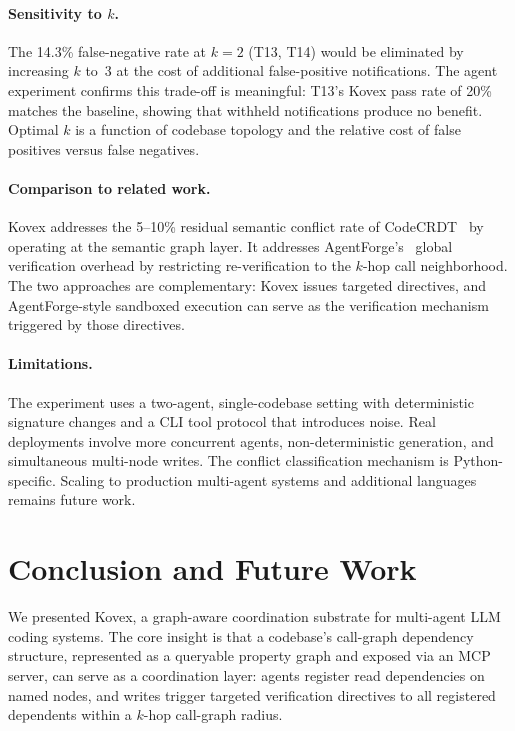 \documentclass[12pt]{article}
\begin{document}
\paragraph{Sensitivity to $k$.}
The 14.3\% false-negative rate at $k=2$ (T13, T14) would be eliminated by
increasing $k$ to~3 at the cost of additional false-positive notifications.
The agent experiment confirms this trade-off is meaningful: T13's Kovex pass
rate of 20\% matches the baseline, showing that withheld notifications produce
no benefit. Optimal $k$ is a function of codebase topology and the relative
cost of false positives versus false negatives.

\paragraph{Comparison to related work.}
Kovex addresses the 5--10\% residual semantic conflict rate of
CodeCRDT~\cite{pugachev2025codecrdt} by operating at the semantic graph layer.
It addresses AgentForge's~\cite{kumar2026agentforge} global verification
overhead by restricting re-verification to the $k$-hop call neighborhood.
The two approaches are complementary: Kovex issues targeted directives, and
AgentForge-style sandboxed execution can serve as the verification mechanism
triggered by those directives.

\paragraph{Limitations.}
The experiment uses a two-agent, single-codebase setting with deterministic
signature changes and a CLI tool protocol that introduces noise. Real
deployments involve more concurrent agents, non-deterministic generation, and
simultaneous multi-node writes. The conflict classification mechanism is
Python-specific. Scaling to production multi-agent systems and additional
languages remains future work.

\section{Conclusion and Future Work}

We presented Kovex, a graph-aware coordination substrate for multi-agent LLM
coding systems. The core insight is that a codebase's call-graph dependency
structure, represented as a queryable property graph and exposed via an MCP
server, can serve as a coordination layer: agents register read dependencies
on named nodes, and writes trigger targeted verification directives to all
registered dependents within a $k$-hop call-graph radius.
\end{document}
